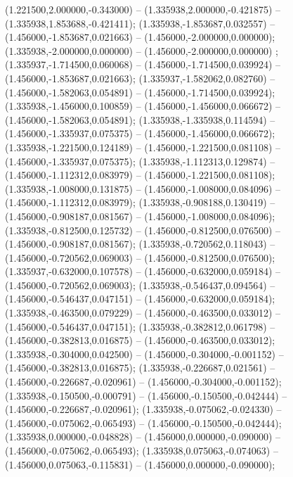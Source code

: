  (1.221500,2.000000,-0.343000) -- (1.335938,2.000000,-0.421875) -- (1.335938,1.853688,-0.421411);
 (1.335938,-1.853687,0.032557) -- (1.456000,-1.853687,0.021663) -- (1.456000,-2.000000,0.000000);
 (1.335938,-2.000000,0.000000) -- (1.456000,-2.000000,0.000000) ;
 (1.335937,-1.714500,0.060068) -- (1.456000,-1.714500,0.039924) -- (1.456000,-1.853687,0.021663);
 (1.335937,-1.582062,0.082760) -- (1.456000,-1.582063,0.054891) -- (1.456000,-1.714500,0.039924);
 (1.335938,-1.456000,0.100859) -- (1.456000,-1.456000,0.066672) -- (1.456000,-1.582063,0.054891);
 (1.335938,-1.335938,0.114594) -- (1.456000,-1.335937,0.075375) -- (1.456000,-1.456000,0.066672);
 (1.335938,-1.221500,0.124189) -- (1.456000,-1.221500,0.081108) -- (1.456000,-1.335937,0.075375);
 (1.335938,-1.112313,0.129874) -- (1.456000,-1.112312,0.083979) -- (1.456000,-1.221500,0.081108);
 (1.335938,-1.008000,0.131875) -- (1.456000,-1.008000,0.084096) -- (1.456000,-1.112312,0.083979);
 (1.335938,-0.908188,0.130419) -- (1.456000,-0.908187,0.081567) -- (1.456000,-1.008000,0.084096);
 (1.335938,-0.812500,0.125732) -- (1.456000,-0.812500,0.076500) -- (1.456000,-0.908187,0.081567);
 (1.335938,-0.720562,0.118043) -- (1.456000,-0.720562,0.069003) -- (1.456000,-0.812500,0.076500);
 (1.335937,-0.632000,0.107578) -- (1.456000,-0.632000,0.059184) -- (1.456000,-0.720562,0.069003);
 (1.335938,-0.546437,0.094564) -- (1.456000,-0.546437,0.047151) -- (1.456000,-0.632000,0.059184);
 (1.335938,-0.463500,0.079229) -- (1.456000,-0.463500,0.033012) -- (1.456000,-0.546437,0.047151);
 (1.335938,-0.382812,0.061798) -- (1.456000,-0.382813,0.016875) -- (1.456000,-0.463500,0.033012);
 (1.335938,-0.304000,0.042500) -- (1.456000,-0.304000,-0.001152) -- (1.456000,-0.382813,0.016875);
 (1.335938,-0.226687,0.021561) -- (1.456000,-0.226687,-0.020961) -- (1.456000,-0.304000,-0.001152);
 (1.335938,-0.150500,-0.000791) -- (1.456000,-0.150500,-0.042444) -- (1.456000,-0.226687,-0.020961);
 (1.335938,-0.075062,-0.024330) -- (1.456000,-0.075062,-0.065493) -- (1.456000,-0.150500,-0.042444);
 (1.335938,0.000000,-0.048828) -- (1.456000,0.000000,-0.090000) -- (1.456000,-0.075062,-0.065493);
 (1.335938,0.075063,-0.074063) -- (1.456000,0.075063,-0.115831) -- (1.456000,0.000000,-0.090000);
